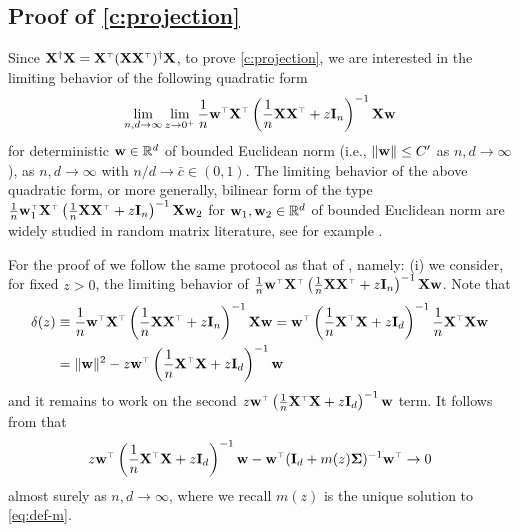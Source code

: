 




\subsection{Proof of \cref{c:projection}}
\label{sec:proof-of-c-projection}

Since $\X^\dagger \X = \X^\top (\X \X^\top)^\dagger \X$, to prove
\cref{c:projection}, we are interested in the limiting behavior of the
following quadratic form
\[
  \lim_{n,d \to \infty} \lim_{z \to 0^+} \frac1n \w^\top \X^\top \left( \frac1n \X \X^\top + z \I_n \right)^{-1} \X \w
\]
for deterministic $\mathbf w \in \mathbb R^{d}$ of bounded Euclidean norm (i.e., $\| \mathbf w \| \le C'$ as $n,d \to \infty$), as $n,d \to \infty$ with $n/d \to \bar c \in (0,1)$. The limiting behavior of the above quadratic form, or more generally, bilinear form of the type $\frac1n \w_1^\top \X^\top \left( \frac1n \X \X^\top + z \I_n \right)^{-1} \X \w_2$ for $\mathbf w_1, \mathbf w_2 \in \mathbb R^{d}$ of bounded Euclidean norm are widely studied in random matrix literature, see for example \cite{hachem2013bilinear}.

For the proof of  we follow the same protocol as that of
, namely: (i) we consider, for fixed $z > 0$, the limiting
behavior of $\frac1n \w^\top \X^\top \left( \frac1n \X \X^\top + z \I_n
\right)^{-1} \X \w$. Note that
\begin{align*}
  \delta(z) &\equiv \frac1n \w^\top \X^\top \left( \frac1n \X \X^\top + z \I_n \right)^{-1} \X \w = \w^\top \left( \frac1n \X^\top \X + z \I_d \right)^{-1} \frac1n \X^\top \X \w \\
  &= \| \w \|^2 - z \w^\top \left( \frac1n \X^\top \X + z \I_d \right)^{-1} \w
\end{align*}
and it remains to work on the second $z \w^\top \left( \frac1n \X^\top \X + z \I_d \right)^{-1} \w$ term.
It follows from \cite{hachem2013bilinear} that
\[
   z \w^\top \left( \frac1n \X^\top \X + z \I_d \right)^{-1} \w - \w^\top (\I_d + m(z) \Sigmab)^{-1} \w^\top \to 0
\]
almost surely as $n,d \to \infty$, where we recall $m(z)$ is the unique solution to \eqref{eq:def-m}.

